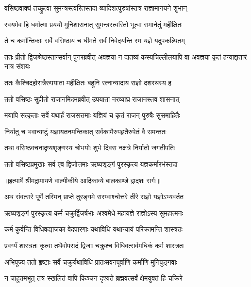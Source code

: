 \twolineshloka
{वसिष्ठवाक्यं तच्छ्रुत्वा सुमन्त्रस्त्वरितस्तदा}
{व्यादिशत्पुरुषांस्तत्र राज्ञामानयने शुभान्} %

\twolineshloka
{स्वयमेव हि धर्मात्मा प्रययौ मुनिशासनात्}
{सुमन्त्रस्त्वरितो भूत्वा समानेतुं महीक्षितः} %

\twolineshloka
{ते च कर्मान्तिकाः सर्वे वसिष्ठाय च धीमते}
{सर्वं निवेदयन्ति स्म यज्ञे यदुपकल्पितम्} %

\threelineshloka
{ततः प्रीतो द्विजश्रेष्ठस्तान्सर्वान् पुनरब्रवीत्}
{अवज्ञया न दातव्यं कस्यचिल्लीलयापि वा}
{अवज्ञया कृतं हन्याद्दातारं नात्र संशयः} %

\twolineshloka
{ततः कैश्चिदहोरात्रैरुपयाता महीक्षितः}
{बहूनि रत्नान्यादाय राज्ञो दशरथस्य ह} %

\twolineshloka
{ततो वसिष्ठः सुप्रीतो राजानमिदमब्रवीत्}
{उपयाता नरव्याघ्र राजानस्तव शासनात्} %

\twolineshloka
{मयापि सत्कृताः सर्वे यथार्हं राजसत्तमाः}
{यज्ञियं च कृतं राजन् पुरुषैः सुसमाहितैः} %

\twolineshloka
{निर्यातु च भवान्यष्टुं यज्ञायतनमन्तिकात्}
{सर्वकामैरुपहृतैरुपेतं वै समन्ततः} %

\twolineshloka
{तथा वसिष्ठवचनादृष्यशृङ्गस्य चोभयोः}
{शुभे दिवस नक्षत्रे निर्यातो जगतीपतिः} %

\twolineshloka
{ततो वसिष्ठप्रमुखाः सर्व एव द्विजोत्तमाः}
{ऋष्यशृङ्गं पुरस्कृत्य यज्ञकर्मारभंस्तदा} %


{॥इत्यार्षे श्रीमद्रामायणे वाल्मीकीये आदिकाव्ये बालकाण्डे द्वादशः सर्गः॥}


\twolineshloka
{अथ संवत्सरे पूर्णे तस्मिन् प्राप्ते तुरङ्गमे}
{सरय्वाश्चोत्तरे तीरे राज्ञो यज्ञोऽभ्यवर्तत} %

\twolineshloka
{ऋष्यशृङ्गं पुरस्कृत्य कर्म चक्रुर्द्विजर्षभाः}
{अश्वमेधे महायज्ञे राज्ञोऽस्य सुमहात्मनः} %

\twolineshloka
{कर्म कुर्वन्ति विधिवद्याजका वेदपारगाः}
{यथाविधि यथान्यायं परिक्रामन्ति शास्त्रतः} %

\twolineshloka
{प्रवर्ग्यं शास्त्रतः कृत्वा तथैवोपसदं द्विजाः}
{चक्रुश्च विधिवत्सर्वमधिकं कर्म शास्त्रतः} %

\twolineshloka
{अभिपूज्य ततो हृष्टाः सर्वे चक्रुर्यथाविधि}
{प्रातःसवनपूर्वाणि कर्माणि मुनिपुङ्गवाः} %

\twolineshloka
{न चाहुतमभूत् तत्र स्खलितं वापि किञ्चन}
{दृश्यते ब्रह्मवत्सर्वं क्षेमयुक्तं हि चक्रिरे} %

